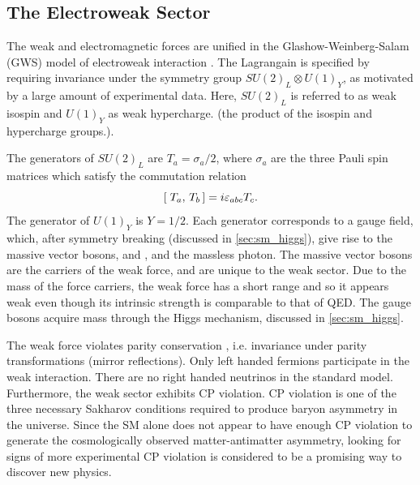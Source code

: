 \subsection{The Electroweak Sector}\label{sec:ew_sector}

The weak and electromagnetic forces are unified in the Glashow-Weinberg-Salam (GWS) model of electroweak interaction \cite{Glashow:1961tr,Weinberg:1967tq,Salam:1968rm}.
The Lagrangain is specified by requiring invariance under the symmetry group $SU(2)_L \otimes U(1)_Y$, as motivated by a large amount of experimental data.
Here, $SU(2)_L$ is referred to as weak isospin and $U(1)_Y$ as weak hypercharge. (the product of the isospin and hypercharge groups.).

The generators of $SU(2)_L$ are $T_a = \sigma_a/2$, where $\sigma_a$ are the three Pauli spin matrices which satisfy the commutation relation 
%
\begin{equation}
[\; T_a,\,T_b\,] = i \varepsilon_{abc} T_c .
\end{equation}
%
The generator of $U(1)_Y$ is $Y = 1/2$.
Each generator corresponds to a gauge field, which, after symmetry breaking (discussed in \cref{sec:sm_higgs}), give rise to the massive vector bosons, \Wpm and \Zboson, and the massless photon.
The massive vector bosons are the carriers of the weak force, and are unique to the weak sector.
Due to the mass of the force carriers, the weak force has a short range and so it appears weak even though its intrinsic strength is comparable to that of QED.
The gauge bosons acquire mass through the Higgs mechanism, discussed in \cref{sec:sm_higgs}.

The weak force violates parity conservation \cite{PhysRev.104.254,PhysRev.105.1413,PhysRev.105.1415}, i.e. invariance under parity transformations (mirror reflections).
Only left handed fermions participate in the weak interaction.
There are no right handed neutrinos in the standard model.
Furthermore, the weak sector exhibits CP violation.
CP violation is one of the three necessary Sakharov conditions required to produce baryon asymmetry in the universe.
Since the SM alone does not appear to have enough CP violation to generate the cosmologically observed matter-antimatter asymmetry, looking for signs of more experimental CP violation is considered to be a promising
way to discover new physics.


